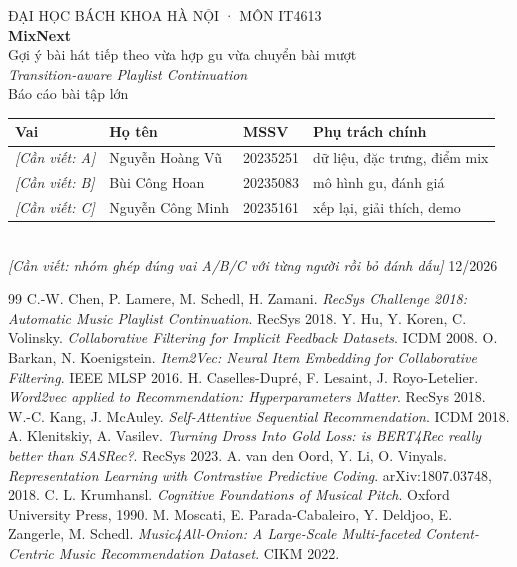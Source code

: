 \documentclass[12pt,a4paper]{article}
\newcommand{\canviet}[1]{{\color{red!70!black}\itshape [Cần viết: #1]}}
\begin{document}
\begin{titlepage}
  \centering
  {\large ĐẠI HỌC BÁCH KHOA HÀ NỘI · MÔN IT4613}\\[3cm]
  {\Huge\bfseries MixNext}\\[0.6cm]
  {\Large Gợi ý bài hát tiếp theo vừa hợp gu vừa chuyển bài mượt}\\[0.3cm]
  {\large\itshape Transition-aware Playlist Continuation}\\[2.5cm]
  {\large Báo cáo bài tập lớn}\\[1.5cm]
  \begin{tabular}{llll}
    \toprule
    \textbf{Vai} & \textbf{Họ tên} & \textbf{MSSV} & \textbf{Phụ trách chính} \\
    \midrule
    \canviet{A} & Nguyễn Hoàng Vũ  & 20235251 & dữ liệu, đặc trưng, điểm mix \\
    \canviet{B} & Bùi Công Hoan    & 20235083 & mô hình gu, đánh giá \\
    \canviet{C} & Nguyễn Công Minh & 20235161 & xếp lại, giải thích, demo \\
    \bottomrule
  \end{tabular}\\[0.4cm]
  {\small \canviet{nhóm ghép đúng vai A/B/C với từng người rồi bỏ đánh dấu}}
  \vfill
  {\large 12/2026}
\end{titlepage}

\tableofcontents
\newpage








\begin{thebibliography}{99}
   C.-W. Chen, P. Lamere, M. Schedl, H. Zamani. \emph{RecSys Challenge 2018: Automatic Music Playlist Continuation}. RecSys 2018.
   Y. Hu, Y. Koren, C. Volinsky. \emph{Collaborative Filtering for Implicit Feedback Datasets}. ICDM 2008.
   O. Barkan, N. Koenigstein. \emph{Item2Vec: Neural Item Embedding for Collaborative Filtering}. IEEE MLSP 2016.
   H. Caselles-Dupré, F. Lesaint, J. Royo-Letelier. \emph{Word2vec applied to Recommendation: Hyperparameters Matter}. RecSys 2018.
   W.-C. Kang, J. McAuley. \emph{Self-Attentive Sequential Recommendation}. ICDM 2018.
   A. Klenitskiy, A. Vasilev. \emph{Turning Dross Into Gold Loss: is BERT4Rec really better than SASRec?}. RecSys 2023.
   A. van den Oord, Y. Li, O. Vinyals. \emph{Representation Learning with Contrastive Predictive Coding}. arXiv:1807.03748, 2018.
   C. L. Krumhansl. \emph{Cognitive Foundations of Musical Pitch}. Oxford University Press, 1990.
   M. Moscati, E. Parada-Cabaleiro, Y. Deldjoo, E. Zangerle, M. Schedl. \emph{Music4All-Onion: A Large-Scale Multi-faceted Content-Centric Music Recommendation Dataset}. CIKM 2022.
\end{thebibliography}
\end{document}
